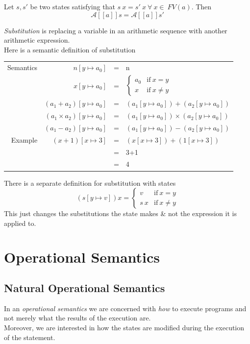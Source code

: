 \documentclass[11pt,a4paper]{article}
\begin{document}
Let $s, s'$ be two states satisfying that $s\ x=s'\ x\ \forall\ x\in\ FV(a)$. Then
$$\mathcal{A}[[a]]s=\mathcal{A}[[a]]s'$$

\textit{Substitution} is replacing a variable in an arithmetic sequence with another arithmetic expression.\\
Here is a semantic definition of substitution\\
\begin{tabular}{rrcl}
Semantics&$n[y\mapsto a_0]$&=&n\\
&$x[y\mapsto a_0]$&=&$\begin{cases}a_0&\mathrm{if\ }x=y\\ x& \mathrm{if\ } x\neq y\end{cases}$\\
&$(a_1+a_2)[y\mapsto a_0]$&=&$(a_1[y\mapsto a_0])+(a_2[y\mapsto a_0])$\\
&$(a_1\times a_2)[y\mapsto a_0]$&=&$(a_1[y\mapsto a_0])\times(a_2[y\mapsto a_0])$\\
&$(a_1-a_2)[y\mapsto a_0]$&=&$(a_1[y\mapsto a_0])-(a_2[y\mapsto a_0])$\\
Example&$(x+1)[x\mapsto 3]$&=&$(x[x\mapsto 3])+(1[x\mapsto 3])$\\
&&=&3+1\\
&&=&4
\end{tabular}

There is a separate definition for substitution with states
$$(s[y\mapsto v])x=\begin{cases}v& \mathrm{if\ }x=y\\s\ x&\mathrm{if\ }x\neq y\end{cases}$$
\nb This just changes the substitutions the state makes \& not the expression it is applied to.\\

\section{Operational Semantics}

\subsection{Natural Operational Semantics}

In an \textit{operational semantics} we are concerned with \textit{how} to execute programs and not merely what the results of the execution are.\\
Moreover, we are interested in how the states are modified during the execution of the statement.\\
\end{document}
